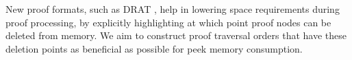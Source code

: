 New proof formats, such as DRAT \cite{raey}, help in lowering space requirements during proof processing, by explicitly highlighting at which point proof nodes can be deleted from memory.
We aim to construct proof traversal orders that have these deletion points as beneficial as possible for peek memory consumption.

